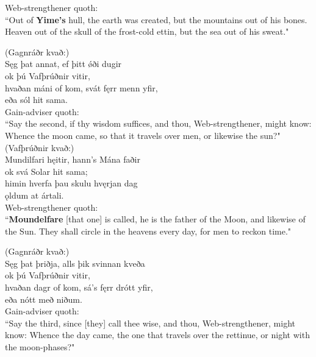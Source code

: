\bvb Web-strengthener quoth: \\ “Out of \textbf{Yime's} hull\footnotemark[35], the earth was created, but the mountains out of his bones. Heaven out of the skull of the frost-cold ettin, but the sea out of his sweat.\footnotemark[36]" \\

(Gagnráðr kvað:) \\%
\bva Sęg þat annat, \hld ef þitt ǿði dugir \\%
ok þú Vafþrúðnir vitir, \\%
hvaðan máni of kom, \hld svát fęrr menn yfir, \\%
eða sól hit sama.\\%

\bvb Gain-adviser quoth: \\ “Say the second, if thy wisdom suffices, and thou, Web-strengthener, might know: Whence the moon came, so that it travels over men, or likewise the sun?" \\

(Vafþrúðnir kvað:) \\%
\bva Mundilfari hęitir, \hld hann's Mána faðir \\%
ok svá Solar hit sama; \\%
himin hverfa \hld þau skulu hvęrjan dag \\%
ǫldum at ártali.\\%

\bvb Web-strengthener quoth: \\ “\textbf{Moundelfare} [that one] is called, he is the father of the Moon, and likewise of the Sun. They shall circle in the heavens every day, for men to reckon time\footnotemark[40]." \\

(Gagnráðr kvað:) \\%
\bva Sęg þat þriðja, \hld alls þik svinnan kveða \\%
ok þú Vafþrúðnir vitir, \\%
hvaðan dagr of kom, \hld sá's fęrr drótt yfir, \\%
eða nótt með niðum.\\%

\bvb Gain-adviser quoth: \\ “Say the third, since [they] call thee wise, and thou, Web-strengthener, might know: Whence the day came, the one that travels over the rettinue, or night with the moon-phases?" \\

